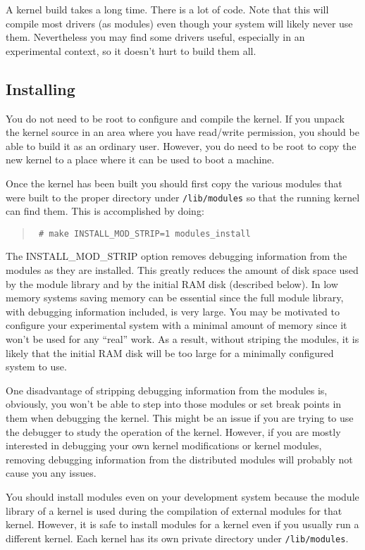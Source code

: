 \documentclass{article}
\newcommand{\filename}[1]{\texttt{#1}}
\newenvironment{commands}
  {\begin{quote} \tt}
  {\end{quote}}
\begin{document}
A kernel build takes a long time. There is a lot of code. Note that this will compile most
drivers (as modules) even though your system will likely never use them. Nevertheless you may
find some drivers useful, especially in an experimental context, so it doesn't hurt to build
them all.

\subsection{Installing}

You do not need to be root to configure and compile the kernel. If you unpack the kernel source
in an area where you have read/write permission, you should be able to build it as an ordinary
user. However, you do need to be root to copy the new kernel to a place where it can be used to
boot a machine.

Once the kernel has been built you should first copy the various modules that were built to the
proper directory under \filename{/lib/modules} so that the running kernel can find them. This is
accomplished by doing:
\begin{commands}
\# make INSTALL\_MOD\_STRIP=1 modules\_install
\end{commands}

The INSTALL\_MOD\_STRIP option removes debugging information from the modules as they are
installed. This greatly reduces the amount of disk space used by the module library and by the
initial RAM disk (described below). In low memory systems saving memory can be essential since
the full module library, with debugging information included, is very large. You may be
motivated to configure your experimental system with a minimal amount of memory since it won't
be used for any ``real'' work. As a result, without striping the modules, it is likely that the
initial RAM disk will be too large for a minimally configured system to use.

One disadvantage of stripping debugging information from the modules is, obviously, you won't be
able to step into those modules or set break points in them when debugging the kernel. This
might be an issue if you are trying to use the debugger to study the operation of the kernel.
However, if you are mostly interested in debugging your own kernel modifications or kernel
modules, removing debugging information from the distributed modules will probably not cause you
any issues.

You should install modules even on your development system because the module library of a
kernel is used during the compilation of external modules for that kernel. However, it is safe
to install modules for a kernel even if you usually run a different kernel. Each kernel has its
own private directory under \filename{/lib/modules}.
\end{document}

